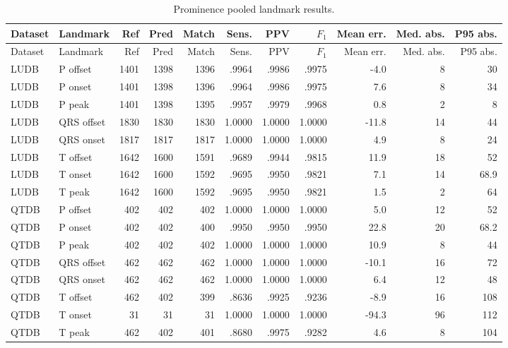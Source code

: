 \documentclass[11pt,a4paper]{article}
\begin{document}
\begin{landscape}
\begin{longtable}{llrrrrrrrrr}
\caption{Prominence pooled landmark results.}\label{tab:prominenceall}\\
\toprule
Dataset & Landmark & Ref & Pred & Match & Sens. & PPV & $F_1$ & Mean err. & Med. abs. & P95 abs. \\
\midrule
\endfirsthead
\toprule
Dataset & Landmark & Ref & Pred & Match & Sens. & PPV & $F_1$ & Mean err. & Med. abs. & P95 abs. \\
\midrule
\endhead
LUDB & P offset & 1401 & 1398 & 1396 & .9964 & .9986 & .9975 & -4.0 & 8 & 30 \\
LUDB & P onset & 1401 & 1398 & 1396 & .9964 & .9986 & .9975 & 7.6 & 8 & 34 \\
LUDB & P peak & 1401 & 1398 & 1395 & .9957 & .9979 & .9968 & 0.8 & 2 & 8 \\
LUDB & QRS offset & 1830 & 1830 & 1830 & 1.0000 & 1.0000 & 1.0000 & -11.8 & 14 & 44 \\
LUDB & QRS onset & 1817 & 1817 & 1817 & 1.0000 & 1.0000 & 1.0000 & 4.9 & 8 & 24 \\
LUDB & T offset & 1642 & 1600 & 1591 & .9689 & .9944 & .9815 & 11.9 & 18 & 52 \\
LUDB & T onset & 1642 & 1600 & 1592 & .9695 & .9950 & .9821 & 7.1 & 14 & 68.9 \\
LUDB & T peak & 1642 & 1600 & 1592 & .9695 & .9950 & .9821 & 1.5 & 2 & 64 \\
QTDB & P offset & 402 & 402 & 402 & 1.0000 & 1.0000 & 1.0000 & 5.0 & 12 & 52 \\
QTDB & P onset & 402 & 402 & 400 & .9950 & .9950 & .9950 & 22.8 & 20 & 68.2 \\
QTDB & P peak & 402 & 402 & 402 & 1.0000 & 1.0000 & 1.0000 & 10.9 & 8 & 44 \\
QTDB & QRS offset & 462 & 462 & 462 & 1.0000 & 1.0000 & 1.0000 & -10.1 & 16 & 72 \\
QTDB & QRS onset & 462 & 462 & 462 & 1.0000 & 1.0000 & 1.0000 & 6.4 & 12 & 48 \\
QTDB & T offset & 462 & 402 & 399 & .8636 & .9925 & .9236 & -8.9 & 16 & 108 \\
QTDB & T onset & 31 & 31 & 31 & 1.0000 & 1.0000 & 1.0000 & -94.3 & 96 & 112 \\
QTDB & T peak & 462 & 402 & 401 & .8680 & .9975 & .9282 & 4.6 & 8 & 104 \\
\bottomrule
\end{longtable}
\end{landscape}
\end{document}
